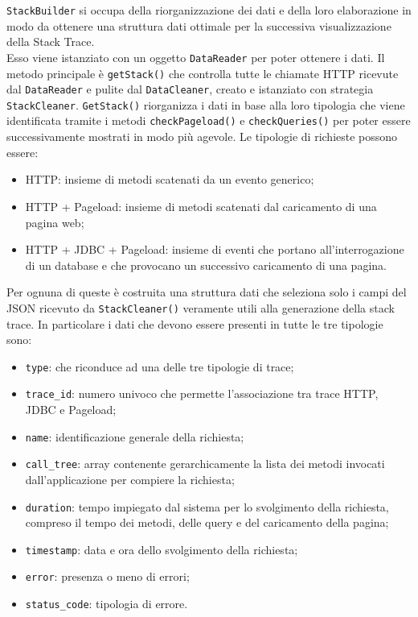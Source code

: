 \texttt{StackBuilder} si occupa della riorganizzazione dei dati e della loro elaborazione in modo da ottenere una struttura dati ottimale per la successiva visualizzazione della Stack Trace.\\
Esso viene istanziato con un oggetto \texttt{DataReader} per poter ottenere i dati.
Il metodo principale è \texttt{getStack()} che controlla tutte le chiamate HTTP ricevute dal \texttt{DataReader} e pulite dal \texttt{DataCleaner}, creato e istanziato con strategia \texttt{StackCleaner}. \texttt{GetStack()} riorganizza i dati in base alla loro tipologia che viene identificata tramite i metodi \texttt{checkPageload()} e \texttt{checkQueries()} per poter essere successivamente mostrati in modo più agevole. Le tipologie di richieste possono essere:
	\begin{itemize}
		\item HTTP: insieme di metodi scatenati da un evento generico;
		\item HTTP + Pageload: insieme di metodi scatenati dal caricamento di una pagina web;
		\item HTTP + JDBC + Pageload: insieme di eventi che portano all'interrogazione di un database e che provocano un successivo caricamento di una pagina.
	\end{itemize}
	Per ognuna di queste è costruita una struttura dati che seleziona solo i campi del JSON ricevuto da \texttt{StackCleaner()} veramente utili alla generazione della stack trace.
	In particolare i dati che devono essere presenti in tutte le tre tipologie  sono:
	\begin{itemize}
		\item \texttt{type}: che riconduce ad una delle tre tipologie di trace;
		\item \texttt{trace\_id}: numero univoco che permette l'associazione tra trace HTTP, JDBC e Pageload;
		\item \texttt{name}: identificazione generale della richiesta;
		\item \texttt{call\_tree}: array contenente gerarchicamente la lista dei metodi invocati dall'applicazione per compiere la richiesta;
		\item \texttt{duration}: tempo impiegato dal sistema per lo svolgimento della richiesta, compreso il tempo dei metodi, delle query e del caricamento della pagina;
		\item \texttt{timestamp}: data e ora dello svolgimento della richiesta;
		\item \texttt{error}: presenza o meno di errori;
		\item \texttt{status\_code}: tipologia di errore.
	\end{itemize}
